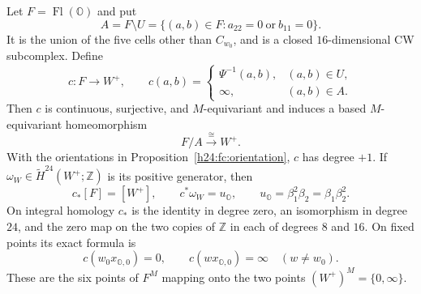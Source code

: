 \begin{theorem}
\label{h24:fc:collapse}
Let $F=\operatorname{Fl}(\mathbb O)$ and put
\[
 A=F\setminus U=\{(a,b)\in F:a_{22}=0\ \text{or}\ b_{11}=0\}.
\]
It is the union of the five cells other than $C_{w_0}$, and is a
closed $16$-dimensional CW subcomplex. Define
\begin{equation}
 c:F\longrightarrow W^+,
 \qquad
 c(a,b)=
 \begin{cases}
   \Psi^{-1}(a,b),&(a,b)\in U,\\
   \infty,&(a,b)\in A.
 \end{cases}
 \label{h24:fc:collapse-map}
\end{equation}
Then $c$ is continuous, surjective, and $M$-equivariant and induces
a based $M$-equivariant homeomorphism
\begin{equation}
 F/A\xrightarrow{\ \cong\ }W^+.
 \label{h24:fc:quotient-homeomorphism}
\end{equation}
With the orientations in Proposition~\ref{h24:fc:orientation},
$c$ has degree $+1$. If $\omega_W\in\widetilde H^{24}(W^+;\mathbb Z)$
is its positive generator, then
\begin{equation}
 c_*[F]=[W^+],\qquad c^*\omega_W=u_{\mathbb O},
 \qquad u_{\mathbb O}=\beta_1^2\beta_2=\beta_1\beta_2^2.
 \label{h24:fc:degree-one}
\end{equation}
On integral homology $c_*$ is the identity in degree zero, an
isomorphism in degree $24$, and the zero map on the two copies
of $\mathbb Z$ in each of degrees $8$ and $16$.
On fixed points its exact formula is
\[
 c(w_0x_{\mathbb O,0})=0,\qquad
 c(wx_{\mathbb O,0})=\infty\quad(w\ne w_0).
\]
These are the six points of $F^M$ mapping onto the two points
$(W^+)^M=\{0,\infty\}$.
\end{theorem}

